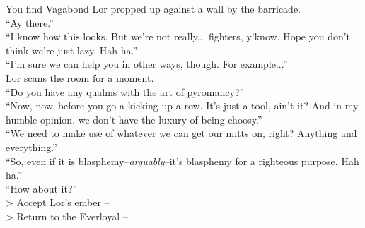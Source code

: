 You find Vagabond Lor propped up against a wall by the barricade.\\

“Ay there.”\\

“I know how this looks. But we’re not really... fighters, y’know. Hope you don’t think we’re just lazy. Hah ha.”\\

“I’m sure we can help you in other ways, though. For example...”\\

Lor scans the room for a moment.\\
“Do you have any qualms with the art of pyromancy?”\\

“Now, now--before you go a-kicking up a row. It’s just a tool, ain’t it? And in my humble opinion, we don’t have the luxury of being choosy.”\\

“We need to make use of whatever we can get our mitts on, right? Anything and everything.”\\

“So, even if it is blasphemy--\emph{arguably}--it’s blasphemy for a righteous purpose. Hah ha.”\\

“How about it?”\\

> Accept Lor’s ember -- \\
> Return to the Everloyal -- 
